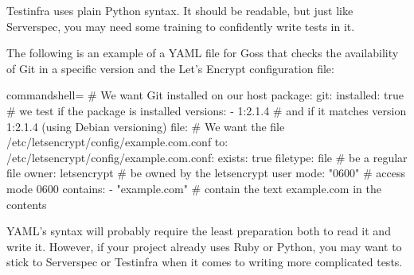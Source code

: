 Testinfra uses plain Python syntax. It should be readable, but just like Serverspec, you may need some training to confidently write tests in it.


The following is an example of a YAML file for Goss that checks the availability of Git in a specific version and the Let's Encrypt configuration file:

\begin{tcblisting}{commandshell={}}
# We want Git installed on our host
package:
  git:
    installed: true # we test if the package is installed
  versions:
  - 1:2.1.4 # and if it matches version 1:2.1.4 (using Debian versioning)
file:
  # We want the file /etc/letsencrypt/config/example.com.conf to:
  /etc/letsencrypt/config/example.com.conf:
    exists: true
  filetype: file # be a regular file
  owner: letsencrypt # be owned by the letsencrypt user
  mode: "0600" # access mode 0600
  contains:
  - "example.com" # contain the text example.com in the contents
\end{tcblisting}

YAML's syntax will probably require the least preparation both to read it and write it. However, if your project already uses Ruby or Python, you may want to stick to Serverspec or Testinfra when it comes to writing more complicated tests.









